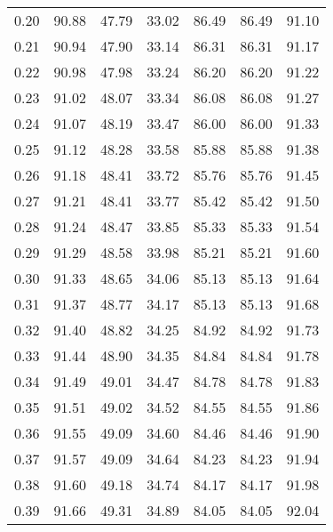 \begin{tabular}{|c|c|c|c|c|c|c|}
      0.20 &     90.88 &     47.79 &      33.02 &   86.49 &      86.49 &         91.10 \\
      0.21 &     90.94 &     47.90 &      33.14 &   86.31 &      86.31 &         91.17 \\
      0.22 &     90.98 &     47.98 &      33.24 &   86.20 &      86.20 &         91.22 \\
      0.23 &     91.02 &     48.07 &      33.34 &   86.08 &      86.08 &         91.27 \\
      0.24 &     91.07 &     48.19 &      33.47 &   86.00 &      86.00 &         91.33 \\
      0.25 &     91.12 &     48.28 &      33.58 &   85.88 &      85.88 &         91.38 \\
      0.26 &     91.18 &     48.41 &      33.72 &   85.76 &      85.76 &         91.45 \\
      0.27 &     91.21 &     48.41 &      33.77 &   85.42 &      85.42 &         91.50 \\
      0.28 &     91.24 &     48.47 &      33.85 &   85.33 &      85.33 &         91.54 \\
      0.29 &     91.29 &     48.58 &      33.98 &   85.21 &      85.21 &         91.60 \\
      0.30 &     91.33 &     48.65 &      34.06 &   85.13 &      85.13 &         91.64 \\
      0.31 &     91.37 &     48.77 &      34.17 &   85.13 &      85.13 &         91.68 \\
      0.32 &     91.40 &     48.82 &      34.25 &   84.92 &      84.92 &         91.73 \\
      0.33 &     91.44 &     48.90 &      34.35 &   84.84 &      84.84 &         91.78 \\
      0.34 &     91.49 &     49.01 &      34.47 &   84.78 &      84.78 &         91.83 \\
      0.35 &     91.51 &     49.02 &      34.52 &   84.55 &      84.55 &         91.86 \\
      0.36 &     91.55 &     49.09 &      34.60 &   84.46 &      84.46 &         91.90 \\
      0.37 &     91.57 &     49.09 &      34.64 &   84.23 &      84.23 &         91.94 \\
      0.38 &     91.60 &     49.18 &      34.74 &   84.17 &      84.17 &         91.98 \\
      0.39 &     91.66 &     49.31 &      34.89 &   84.05 &      84.05 &         92.04 \\

\end{tabular}
